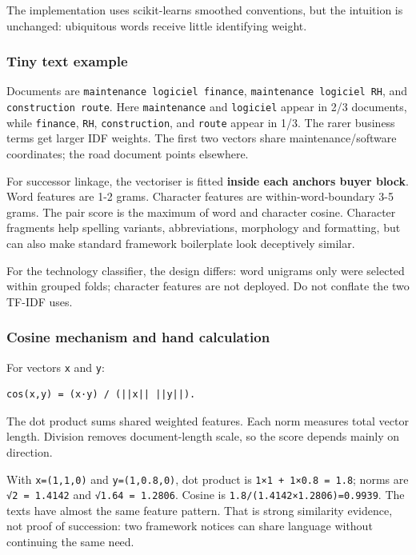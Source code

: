 The implementation uses scikit-learn\textquotesingle s smoothed
conventions, but the intuition is unchanged: ubiquitous words receive
little identifying weight.

\subsubsection{Tiny text example}\label{tiny-text-example}

Documents are \texttt{maintenance\ logiciel\ finance},
\texttt{maintenance\ logiciel\ RH}, and \texttt{construction\ route}.
Here \texttt{maintenance} and \texttt{logiciel} appear in 2/3 documents,
while \texttt{finance}, \texttt{RH}, \texttt{construction}, and
\texttt{route} appear in 1/3. The rarer business terms get larger IDF
weights. The first two vectors share maintenance/software coordinates;
the road document points elsewhere.

For successor linkage, the vectoriser is fitted \textbf{inside each
anchor\textquotesingle s buyer block}. Word features are 1-2 grams.
Character features are within-word-boundary 3-5 grams. The pair score is
the maximum of word and character cosine. Character fragments help
spelling variants, abbreviations, morphology and formatting, but can
also make standard framework boilerplate look deceptively similar.

For the technology classifier, the design differs: word unigrams only
were selected within grouped folds; character features are not deployed.
Do not conflate the two TF-IDF uses.

\subsubsection{Cosine mechanism and hand
calculation}\label{cosine-mechanism-and-hand-calculation}

For vectors \texttt{x} and \texttt{y}:

\begin{verbatim}
cos(x,y) = (x·y) / (||x|| ||y||).
\end{verbatim}

The dot product sums shared weighted features. Each norm measures total
vector length. Division removes document-length scale, so the score
depends mainly on direction.

With \texttt{x=(1,1,0)} and \texttt{y=(1,0.8,0)}, dot product is
\texttt{1×1\ +\ 1×0.8\ =\ 1.8}; norms are \texttt{√2\ =\ 1.4142} and
\texttt{√1.64\ =\ 1.2806}. Cosine is
\texttt{1.8/(1.4142×1.2806)=0.9939}. The texts have almost the same
feature pattern. That is strong similarity evidence, not proof of
succession: two framework notices can share language without continuing
the same need.

